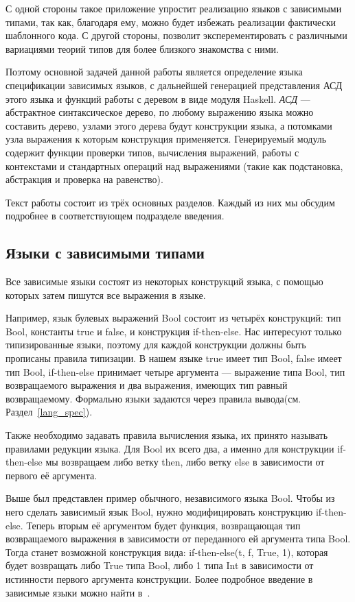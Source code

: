 С одной стороны такое приложение упростит реализацию языков с зависимыми типами, так как, благодаря ему, можно будет избежать реализации фактически шаблонного кода. С другой стороны, позволит эксперементировать с различными вариациями теорий типов для более близкого знакомства с ними.

Поэтому основной задачей данной работы является определение языка спецификации зависимых языков, с дальнейшей генерацией представления АСД этого языка и функций работы с деревом в виде модуля Haskell\cite{haskell}. \textit{АСД} --- абстрактное синтаксическое дерево, по любому выражению языка можно составить дерево, узлами этого дерева будут конструкции языка, а потомками узла выражения к которым конструкция применяется. Генерируемый модуль содержит функции проверки типов, вычисления выражений, работы с контекстами и стандартных операций над выражениями (такие как подстановка, абстракция и проверка на равенство).

Текст работы состоит из трёх основных разделов. Каждый из них мы обсудим подробнее в соответствующем подразделе введения.

\subsection*{Языки с зависимыми типами}

Все зависимые языки состоят из некоторых конструкций языка, с помощью которых затем пишутся все выражения в языке.

Например, язык булевых выражений Bool состоит из четырёх конструкций: тип Bool, константы true и false, и конструкция if-then-else. Нас интересуют только типизированные языки, поэтому для каждой конструкции должны быть прописаны правила типизации. В нашем языке true имеет тип Bool, false имеет тип Bool, if-then-else принимает четыре аргумента --- выражение типа Bool, тип возвращаемого выражения и два выражения, имеющих тип равный возвращаемому. Формально языки задаются через правила вывода(см. Раздел~\ref{lang_spec}).

Также необходимо задавать правила вычисления языка, их принято называть правилами редукции языка. Для Bool их всего два, а именно для конструкции if-then-else мы возвращаем либо ветку then, либо ветку else в зависимости от первого её аргумента.

Выше был представлен пример обычного, независимого языка Bool. Чтобы из него сделать зависимый язык Bool, нужно модифицировать конструкцию if-then-else. Теперь вторым её аргументом будет функция, возвращающая тип возвращаемого выражения в зависимости от переданного ей аргумента типа Bool. Тогда станет возможной конструкция вида: if-then-else(t, f, True, 1), которая будет возвращать либо True типа Bool, либо 1 типа Int в зависимости от истинности первого аргумента конструкции. Более подробное введение в зависимые языки можно найти в~\cite{martin_lof}.

